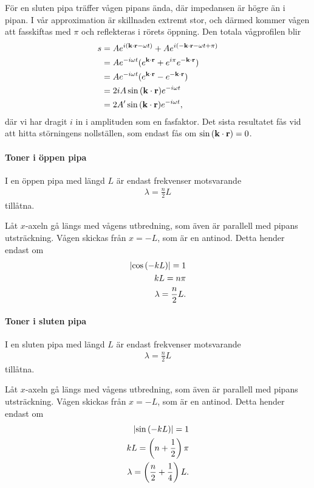 \deriv
För en sluten pipa träffer vågen pipans ända, där impedansen är högre än i pipan. I vår approximation är skillnaden extremt stor, och därmed kommer vågen att fasskiftas med $\pi$ och reflekteras i rörets öppning. Den totala vågprofilen blir
\begin{align*}
	s &= Ae^{i(\vect{k}\cdot\vect{r} - \omega t)} + Ae^{i(-\vect{k}\cdot\vect{r} - \omega t + \pi)} \\
	  &= Ae^{-i\omega t}(e^{\vect{k}\cdot\vect{r}} + e^{i\pi}e^{-\vect{k}\cdot\vect{r}}) \\
	  &= Ae^{-i\omega t}(e^{\vect{k}\cdot\vect{r}} - e^{-\vect{k}\cdot\vect{r}}) \\
	  &= 2iA\sin{(\vect{k}\cdot\vect{r})}e^{-i\omega t}\\
	  &= 2A'\sin{(\vect{k}\cdot\vect{r})}e^{-i\omega t},
\end{align*}
där vi har dragit $i$ in i amplituden som en fasfaktor. Det sista resultatet fås vid att hitta störningens nollställen, som endast fås om $\sin{(\vect{k}\cdot\vect{r})} = 0$.

\paragraph{Toner i öppen pipa}
I en öppen pipa med längd $L$ är endast frekvenser motsvarande
\begin{align*}
	\lambda = \frac{n}{2}L
\end{align*}
tillåtna.

\deriv
Låt $x$-axeln gå längs med vågens utbredning, som även är parallell med pipans utsträckning. Vågen skickas från $x = -L$, som är en antinod. Detta hender endast om
\begin{align*}
	\abs{\cos{(-kL)}} = 1 \\
	kL = n\pi \\
	\lambda = \frac{n}{2}L.
\end{align*}

\paragraph{Toner i sluten pipa}
I en sluten pipa med längd $L$ är endast frekvenser motsvarande
\begin{align*}
	\lambda = \frac{n}{2}L
\end{align*}
tillåtna.

\deriv
Låt $x$-axeln gå längs med vågens utbredning, som även är parallell med pipans utsträckning. Vågen skickas från $x = -L$, som är en antinod. Detta hender endast om
\begin{align*}
	\abs{\sin{(-kL)}} = 1 \\
	kL = \left(n+ \frac{1}{2}\right)\pi \\
	\lambda = \left(\frac{n}{2} + \frac{1}{4}\right)L.
\end{align*}

